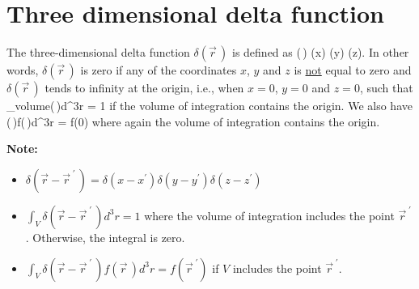 \section{Three dimensional delta function}
The three-dimensional delta function $\delta(\vec{r}\,)$ is defined as
\be
\delta(\,)  \equiv \delta(x) \delta(y) \delta(z).
\ee
In other words, $\delta(\vec{r}\,)$ is zero if any of the coordinates $x$, $y$ and $z$ is {\underline{not}} equal to 
zero and $\delta(\vec{r}\,)$ tends to infinity at the origin, i.e., when $x=0$, $y=0$ and $z=0$, such that
\be
\int_{{\rm volume}}\delta(\,)d^3r = 1
\ee
if the volume of integration contains the origin. We also have
 \be
\int \delta(\,)f(\,)d^3r = f(0)
\ee
where again the volume of integration contains the origin. 

\vspace{10 mm}
\noindent
{\bf Note:}
\begin{itemize}
\item
$\delta(\vec{r} - \vec{r}^{\;\prime}\, ) = \delta(x-x^{\prime})\delta(y-y^{\prime})\delta(z-z^{\prime})$
\item $ \int_{V} \delta(\vec{r} - \vec{r}^{\;\prime}\, )d^3r =1 $
\newline
where the volume of integration includes the point $\vec{r}^{\;\prime}$. Otherwise, the integral is zero.
\item $ \int_{V} \delta(\vec{r} - \vec{r}^{\;\prime}\, ) f(\vec{r}\,)d^3r = f(\vec{r}^{\; \prime})$ \newline
if $V$ includes the point $\vec{r}^{\;\prime}$.

\end{itemize}



